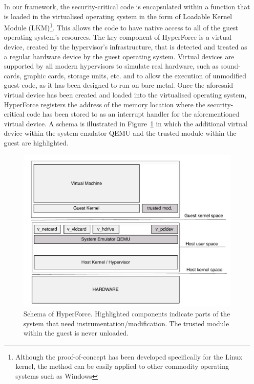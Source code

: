 In our framework, the security-critical code is encapsulated within a function that is loaded in the virtualised operating system in the form of Loadable Kernel Module (LKM)\footnote{Although the proof-of-concept has been developed specifically for the Linux kernel, the method can be easily applied to other commodity operating systems such as Windows}. This allows the code to have native access to all of the guest operating system's resources.
The key component of HyperForce is a virtual device, created by the hypervisor's infrastructure, that is detected and treated as a regular hardware device by the guest operating system.  
Virtual devices are supported by all modern hypervisors to simulate real hardware, such as sound-cards, graphic cards, storage units, etc. and to allow the execution of unmodified guest code, as it has been designed to run on bare metal. 
Once the aforesaid virtual device has been created and loaded into the virtualised operating system, HyperForce registers the address of the memory location where the security-critical code has been stored to as an interrupt handler for the aforementioned virtual device. A schema is illustrated in Figure~\ref{hyperforce_schema} in which the additional virtual device within the system emulator QEMU \cite{qemu} and the trusted module within the guest are highlighted. 

\begin{figure} 
\begin{center}
\includegraphics[scale=0.5]{images/hyperforce_schema.pdf}
\caption{Schema of HyperForce. Highlighted components indicate parts of the system that need instrumentation/modification. The trusted module within the guest is never unloaded.}
\label{hyperforce_schema}
\end{center}
\end{figure}

